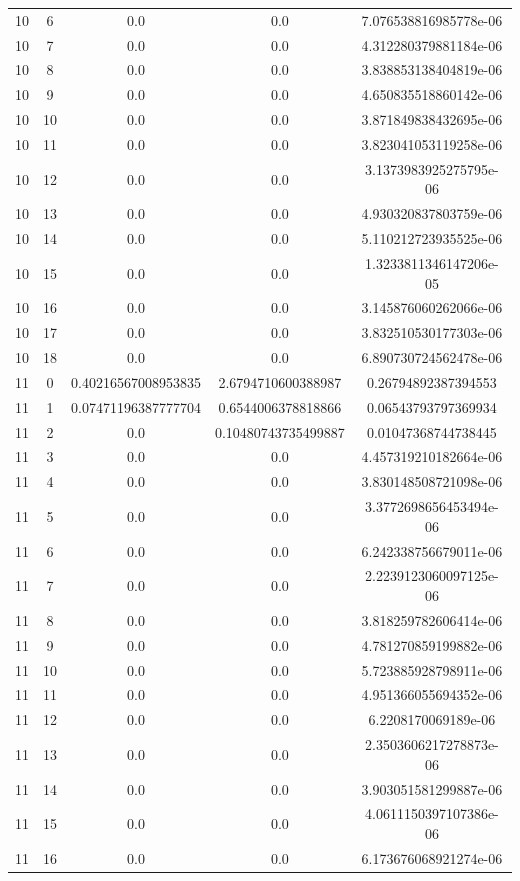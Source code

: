 \documentclass{article}
\begin{document}
\begin{table}[h]
\begin{tabular}{|c|c|c|c|c|}
10 & 6 & 0.0 & 0.0 & 7.076538816985778e-06 \\
10 & 7 & 0.0 & 0.0 & 4.312280379881184e-06 \\
10 & 8 & 0.0 & 0.0 & 3.838853138404819e-06 \\
10 & 9 & 0.0 & 0.0 & 4.650835518860142e-06 \\
10 & 10 & 0.0 & 0.0 & 3.871849838432695e-06 \\
10 & 11 & 0.0 & 0.0 & 3.823041053119258e-06 \\
10 & 12 & 0.0 & 0.0 & 3.1373983925275795e-06 \\
10 & 13 & 0.0 & 0.0 & 4.930320837803759e-06 \\
10 & 14 & 0.0 & 0.0 & 5.110212723935525e-06 \\
10 & 15 & 0.0 & 0.0 & 1.3233811346147206e-05 \\
10 & 16 & 0.0 & 0.0 & 3.145876060262066e-06 \\
10 & 17 & 0.0 & 0.0 & 3.832510530177303e-06 \\
10 & 18 & 0.0 & 0.0 & 6.890730724562478e-06 \\
11 & 0 & 0.40216567008953835 & 2.6794710600388987 & 0.26794892387394553 \\
11 & 1 & 0.07471196387777704 & 0.6544006378818866 & 0.06543793797369934 \\
11 & 2 & 0.0 & 0.10480743735499887 & 0.01047368744738445 \\
11 & 3 & 0.0 & 0.0 & 4.457319210182664e-06 \\
11 & 4 & 0.0 & 0.0 & 3.830148508721098e-06 \\
11 & 5 & 0.0 & 0.0 & 3.3772698656453494e-06 \\
11 & 6 & 0.0 & 0.0 & 6.242338756679011e-06 \\
11 & 7 & 0.0 & 0.0 & 2.2239123060097125e-06 \\
11 & 8 & 0.0 & 0.0 & 3.818259782606414e-06 \\
11 & 9 & 0.0 & 0.0 & 4.781270859199882e-06 \\
11 & 10 & 0.0 & 0.0 & 5.723885928798911e-06 \\
11 & 11 & 0.0 & 0.0 & 4.951366055694352e-06 \\
11 & 12 & 0.0 & 0.0 & 6.2208170069189e-06 \\
11 & 13 & 0.0 & 0.0 & 2.3503606217278873e-06 \\
11 & 14 & 0.0 & 0.0 & 3.903051581299887e-06 \\
11 & 15 & 0.0 & 0.0 & 4.0611150397107386e-06 \\
11 & 16 & 0.0 & 0.0 & 6.173676068921274e-06 \\

\end{tabular}
\end{table}
\end{document}
